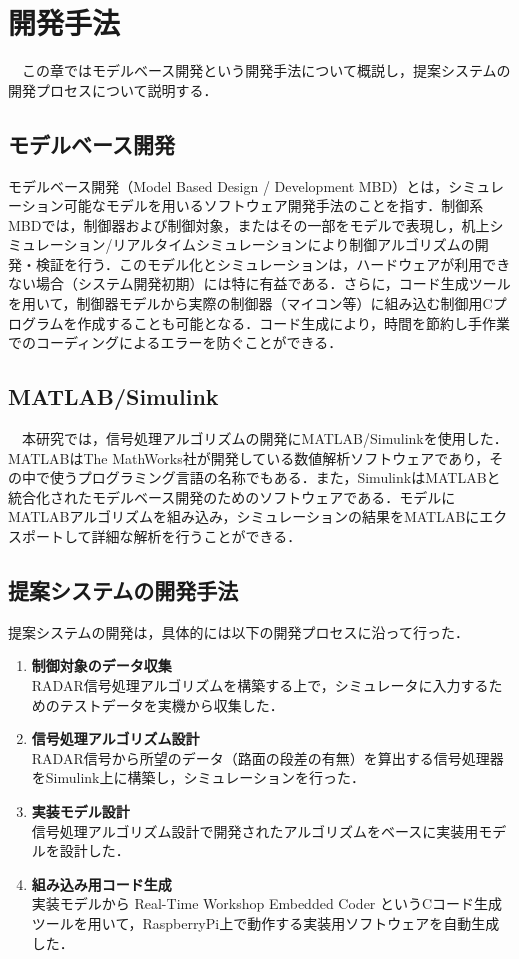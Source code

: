 \chapter{開発手法}
　この章ではモデルベース開発という開発手法について概説し，提案システムの開発プロセスについて説明する．

\section{モデルベース開発}
モデルベース開発（Model Based Design / Development MBD）とは，シミュレーション可能なモデルを用いるソフトウェア開発手法のことを指す．制御系MBDでは，制御器および制御対象，またはその一部をモデルで表現し，机上シミュレーション/リアルタイムシミュレーションにより制御アルゴリズムの開発・検証を行う．このモデル化とシミュレーションは，ハードウェアが利用できない場合（システム開発初期）には特に有益である．さらに，コード生成ツールを用いて，制御器モデルから実際の制御器（マイコン等）に組み込む制御用Cプログラムを作成することも可能となる．コード生成により，時間を節約し手作業でのコーディングによるエラーを防ぐことができる\cite{MBD_Simulink}．

\section{MATLAB/Simulink}
　本研究では，信号処理アルゴリズムの開発にMATLAB/Simulinkを使用した．MATLABはThe MathWorks社が開発している数値解析ソフトウェアであり，その中で使うプログラミング言語の名称でもある\cite{MATLAB_MathWorks}．また，SimulinkはMATLABと統合化されたモデルベース開発のためのソフトウェアである．モデルにMATLABアルゴリズムを組み込み，シミュレーションの結果をMATLABにエクスポートして詳細な解析を行うことができる\cite{Simulink_MathWorks}．


\section{提案システムの開発手法}
提案システムの開発は，具体的には以下の開発プロセスに沿って行った．
\begin{enumerate}
    \item \textbf{制御対象のデータ収集}\\
        RADAR信号処理アルゴリズムを構築する上で，シミュレータに入力するためのテストデータを実機から収集した．
    \item \textbf{信号処理アルゴリズム設計}\\
        RADAR信号から所望のデータ（路面の段差の有無）を算出する信号処理器をSimulink上に構築し，シミュレーションを行った．
    \item \textbf{実装モデル設計}\\
        信号処理アルゴリズム設計で開発されたアルゴリズムをベースに実装用モデルを設計した．
    \item \textbf{組み込み用コード生成}\\
        実装モデルから Real-Time Workshop Embedded Coder というCコード生成ツールを用いて，RaspberryPi上で動作する実装用ソフトウェアを自動生成した．
\end{enumerate}
